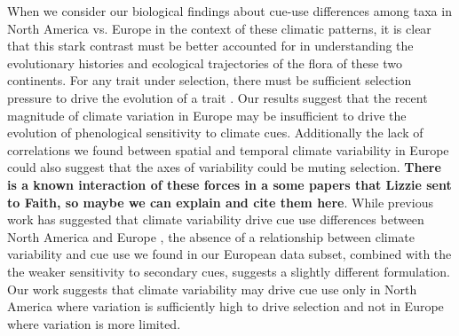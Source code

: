 \documentclass[12pt]{article}
\begin{document}
\noindent When we consider our biological findings about cue-use differences among taxa in North America vs. Europe in the context of these climatic patterns, it is clear that this stark contrast must be better accounted for in understanding the evolutionary histories and ecological trajectories of the flora of these two continents. For any trait under selection, there must be sufficient selection pressure to drive the evolution of a trait \citep{}. Our results suggest that the recent magnitude of climate variation in Europe may be insufficient to drive the evolution of phenological sensitivity to climate cues. Additionally the lack of correlations we found between spatial and temporal climate variability in Europe could also suggest that the axes of variability could be muting selection.%
\textbf{There is a known interaction of these forces in a some papers that Lizzie sent to Faith, so maybe we can explain and cite them here}. While previous work has suggested that climate variability drive cue use differences between North America and Europe \citep{Zohner:2017aa}, the absence of a relationship between climate variability and cue use we found in our European data subset, combined with the the weaker sensitivity to secondary cues, suggests a slightly different formulation. Our work suggests that climate variability may drive cue use only in North America where variation is sufficiently high to drive selection and not in Europe where variation is more limited. 
\end{document}
